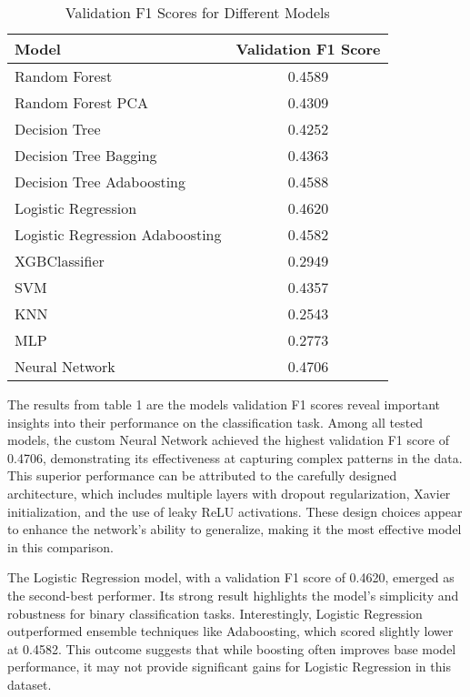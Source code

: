 \documentclass{article} %
\begin{document}
\begin{table}[ht!]
    \centering
    \begin{tabular}{|l|c|}
        \hline
        \textbf{Model} & \textbf{Validation F1 Score} \\ \hline
        Random Forest & 0.4589 \\ \hline
        Random Forest PCA & 0.4309 \\ \hline
        Decision Tree & 0.4252 \\ \hline
        Decision Tree Bagging & 0.4363 \\ \hline
        Decision Tree Adaboosting & 0.4588 \\ \hline
        Logistic Regression & 0.4620 \\ \hline
        Logistic Regression Adaboosting & 0.4582 \\ \hline
        XGBClassifier & 0.2949 \\ \hline
        SVM & 0.4357 \\ \hline
        KNN & 0.2543 \\ \hline
        MLP & 0.2773 \\ \hline
        Neural Network & 0.4706 \\ \hline
    \end{tabular}
    \caption{Validation F1 Scores for Different Models }
    \label{tab:validation-f1-scores}
\end{table}


The results from table 1 are the models validation F1 scores reveal important insights into their performance on the classification task. Among all tested models, the custom Neural Network achieved the highest validation F1 score of 0.4706, demonstrating its effectiveness at capturing complex patterns in the data. This superior performance can be attributed to the carefully designed architecture, which includes multiple layers with dropout regularization, Xavier initialization, and the use of leaky ReLU activations. These design choices appear to enhance the network's ability to generalize, making it the most effective model in this comparison.

The Logistic Regression model, with a validation F1 score of 0.4620, emerged as the second-best performer. Its strong result highlights the model's simplicity and robustness for binary classification tasks. Interestingly, Logistic Regression outperformed ensemble techniques like Adaboosting, which scored slightly lower at 0.4582. This outcome suggests that while boosting often improves base model performance, it may not provide significant gains for Logistic Regression in this dataset.
\end{document}
